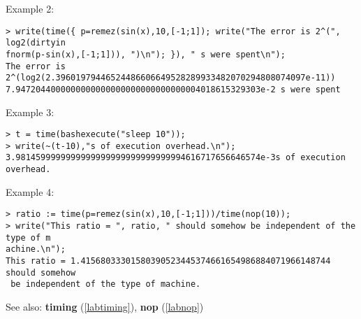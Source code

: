 \noindent Example 2: 
\begin{center}\begin{minipage}{15cm}\begin{Verbatim}[frame=single]
> write(time({ p=remez(sin(x),10,[-1;1]); write("The error is 2^(", log2(dirtyin
fnorm(p-sin(x),[-1;1])), ")\n"); }), " s were spent\n");
The error is 2^(log2(2.39601979446524486606649528289933482070294808074097e-11))
7.9472044000000000000000000000000000004018615329303e-2 s were spent
\end{Verbatim}
\end{minipage}\end{center}
\noindent Example 3: 
\begin{center}\begin{minipage}{15cm}\begin{Verbatim}[frame=single]
> t = time(bashexecute("sleep 10"));
> write(~(t-10),"s of execution overhead.\n");
3.9814599999999999999999999999999994616717656646574e-3s of execution overhead.
\end{Verbatim}
\end{minipage}\end{center}
\noindent Example 4: 
\begin{center}\begin{minipage}{15cm}\begin{Verbatim}[frame=single]
> ratio := time(p=remez(sin(x),10,[-1;1]))/time(nop(10));
> write("This ratio = ", ratio, " should somehow be independent of the type of m
achine.\n");
This ratio = 1.41568033301580390523445374661654986884071966148744 should somehow
 be independent of the type of machine.
\end{Verbatim}
\end{minipage}\end{center}
See also: \textbf{timing} (\ref{labtiming}), \textbf{nop} (\ref{labnop})
